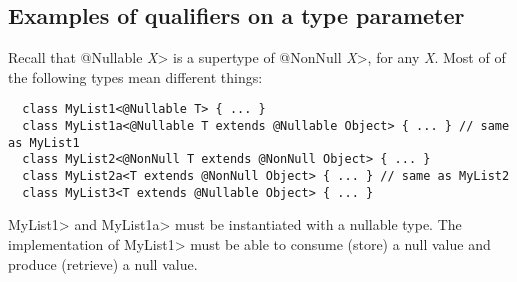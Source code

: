 %
%
%
%


\subsection{Examples of qualifiers on a type parameter\label{type-parameter-qualifier-examples}}

Recall that \<@Nullable \emph{X}> is a supertype of \<@NonNull \emph{X}>,
for any \emph{X}\@.
Most of of the following types mean different things:

\begin{Verbatim}
  class MyList1<@Nullable T> { ... }
  class MyList1a<@Nullable T extends @Nullable Object> { ... } // same as MyList1
  class MyList2<@NonNull T extends @NonNull Object> { ... }
  class MyList2a<T extends @NonNull Object> { ... } // same as MyList2
  class MyList3<T extends @Nullable Object> { ... }
\end{Verbatim}

\<MyList1> and \<MyList1a> must be instantiated with a nullable type.
The implementation of \<MyList1> must be able to consume (store) a null
value and produce (retrieve) a null value.

